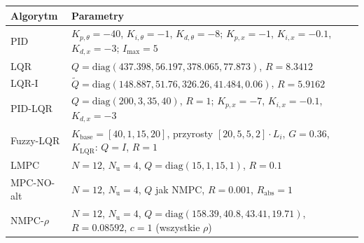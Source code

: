 \begin{tabular}{lp{12.5cm}}
\hline
Algorytm & Parametry \\
\hline
PID & $K_{p,\theta}=-40$, $K_{i,\theta}=-1$, $K_{d,\theta}=-8$; $K_{p,x}=-1$, $K_{i,x}=-0.1$, $K_{d,x}=-3$; $I_{\max}=5$ \\
LQR & $Q=\mathrm{diag}(437.398, 56.197, 378.065, 77.873)$, $R=8.3412$ \\
LQR-I & $\tilde{Q}=\mathrm{diag}(148.887, 51.76, 326.26, 41.484, 0.06)$, $R=5.9162$ \\
PID-LQR & $Q=\mathrm{diag}(200, 3, 35, 40)$, $R=1$; $K_{p,x}=-7$, $K_{i,x}=-0.1$, $K_{d,x}=-3$ \\
Fuzzy-LQR & $K_\mathrm{base}=[40,1,15,20]$, przyrosty $[20,5,5,2]\cdot L_i$, $G=0.36$, $K_\mathrm{LQR}$: $Q=I$, $R=1$ \\
LMPC & $N=12$, $N_\mathrm{u}=4$, $Q=\mathrm{diag}(15, 1, 15, 1)$, $R=0.1$ \\
MPC-NO-alt & $N=12$, $N_\mathrm{u}=4$, $Q$ jak NMPC, $R=0.001$, $R_\mathrm{abs}=1$ \\
NMPC-$\rho$ & $N=12$, $N_\mathrm{u}=4$, $Q=\mathrm{diag}(158.39, 40.8, 43.41, 19.71)$, $R=0.08592$, $c=1$ (wszystkie $\rho$) \\
\hline
\end{tabular}
